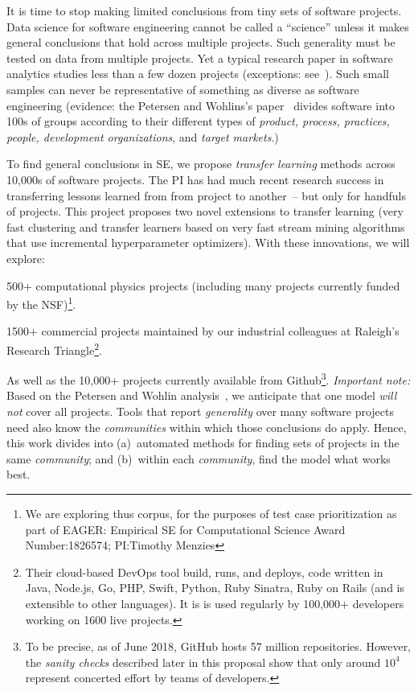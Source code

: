 

It is time to stop making 
limited conclusions from tiny sets of 
software projects.
Data science for software engineering
cannot be called a ``science'' unless
it makes general conclusions that hold across
multiple projects.  Such generality must be
tested on data from  multiple projects. Yet a typical 
research paper in software analytics studies less
than a 
few dozen projects  (exceptions: see~\cite{papersTahtTalkto100sofProjects}). Such small samples can never be representative of something as diverse as software engineering (evidence:
the Petersen and Wohlins's paper~\cite{Petersen2009}   divides software into 100s of groups according to their different types of
{\em product, 
process, practices, people, 
development organizations}, and
{\em target markets}.)

To find general conclusions in SE,
we propose  {\em transfer learning}
methods across 10,000s of software projects.
The PI has had much recent research success
in transferring lessons learned from from project to another~\cite{NamTSE17,allRahulsRecentPubs}-- but only for  handfuls of projects. 
This project proposes two  novel extensions to
transfer learning
(very fast clustering and transfer
learners based 
on  
very fast stream mining  algorithms that use
incremental hyperparameter optimizers).
With these innovations, we will explore:
\bi
\item
 500+
computational physics projects (including many projects currently funded by the NSF)\footnote{
We are exploring thus corpus, for the purposes
of test case prioritization as part of 
EAGER: Empirical SE for Computational Science
Award Number:1826574; PI:Timothy Menzies}. 
\item
1500+ 
commercial projects maintained by our industrial colleagues at Raleigh's Research Triangle\footnote{Their cloud-based  DevOps tool    build, runs, and deploys, code written in   Java, Node.js,  Go, PHP,  Swift,  Python,  Ruby  Sinatra,  Ruby  on Rails (and  is extensible to  other languages).   It is  is used regularly by   100,000+  developers working on   1600 live projects.}.
\item
As well as the 10,000+  projects currently available from Github\footnote{ To be precise,
as of June 2018, GitHub  hosts  57 million repositories. However,  the {\em sanity checks} described later in this proposal show that only around $10^4$ represent concerted  effort by teams of developers.}.
\ei
{\em Important note:} Based on the 
Petersen and Wohlin analysis~\cite{Petersen2009}, we 
anticipate that one model {\em will not} cover
all  projects. 
Tools that report {\em generality} over many software projects need also know the {\em communities} within which those conclusions do  apply. 
Hence, this work divides into 
 (a)~automated methods for finding sets of  
projects in the same {\em community};
and (b)~within each {\em community}, 
find the model what works best.  


